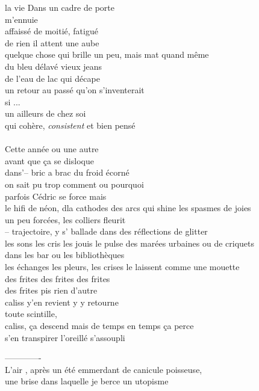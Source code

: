 \documentclass{article}
\begin{document}
\begin{paracol}{2}
la vie
Dans un cadre de porte\\
m'ennuie\\
affaissé de moitié, fatigué\\
de rien il attent une aube\\
quelque chose qui brille un peu, mais mat quand même\\
du bleu délavé vieux jeans\\
de l'eau de lac qui décape\\
un retour au passé qu'on s'inventerait\\
si ... \\
un ailleurs de chez soi \\
qui cohère, \textit{consistent} et bien pensé\\
\\
\switchcolumn
Cette année ou une autre\\
avant que ça se disloque\\
dans'--  bric a brac du froid écorné \\
on sait pu trop comment ou pourquoi\\
parfois Cédric se force mais\\
le hifi de néon, dla cathodes des arcs
qui shine les spasmes de joies\\
un peu forcées, les colliers fleurit\\
-- trajectoire, y s' ballade dans des réflections de glitter\\
les sons les cris les jouis le pulse
des marées urbaines ou de criquets\\
dans les bar ou les bibliothèques\\
les échanges les pleurs, les crises
le laissent comme une mouette\\
des frites des frites des frites\\
des frites pis rien d'autre\\
caliss y'en revient y y retourne \\
toute scintille, \\
caliss, ça descend mais
de temps en temps ça perce\\
s'en transpirer l'oreillé s'assoupli\\

\end{paracol}
\clearpage
-------------\\
L'air , après un été emmerdant de canicule poisseuse,\\
une brise dans laquelle je berce un utopisme\\
\end{document}
